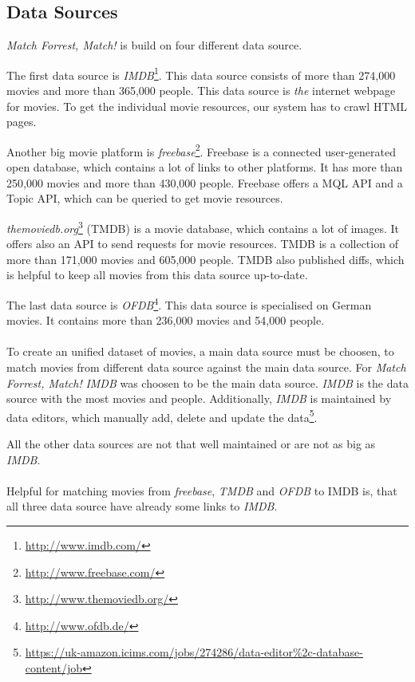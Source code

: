 \subsection{Data Sources}
\label{subsec_method_datasources}

\emph{Match Forrest, Match!} is build on four different data source.

The first data source is \textit{IMDB}\footnote{\url{http://www.imdb.com/}}.
This data source consists of more than 274,000 movies and more than 365,000 people.
This data source is \textit{the} internet webpage for movies.
To get the individual movie resources, our system has to crawl HTML pages.

Another big movie platform is \textit{freebase}\footnote{\url{http://www.freebase.com/}}.
Freebase is a connected user-generated open database, which contains a lot of links to other platforms.
It has more than 250,000 movies and more than 430,000 people.
Freebase offers a MQL API and a Topic API, which can be queried to get movie resources.

\textit{themoviedb.org}\footnote{\url{http://www.themoviedb.org/}} (TMDB) is a movie database, which contains a lot of images.
It offers also an API to send requests for movie resources.
TMDB is a collection of more than 171,000 movies and 605,000 people.
TMDB also published diffs, which is helpful to keep all movies from this data source up-to-date.

The last data source is \textit{OFDB}\footnote{\url{http://www.ofdb.de/}}.
This data source is specialised on German movies.
It contains more than 236,000 movies and 54,000 people.
\\ \\
To create an unified dataset of movies, a main data source must be choosen, to match movies from different data source against the main data source.
For \emph{Match Forrest, Match!} \textit{IMDB} was choosen to be the main data source.
\textit{IMDB} is the data source with the most movies and people.
Additionally, \textit{IMDB} is maintained by data editors, which manually add, delete and update the data\footnote{\url{https://uk-amazon.icims.com/jobs/274286/data-editor\%2c-database-content/job}}.

All the other data sources are not that well maintained or are not as big as \textit{IMDB}.
\\ \\
Helpful for matching movies from \textit{freebase}, \textit{TMDB} and \textit{OFDB} to IMDB is, that all three data source have already some links to \textit{IMDB}.

